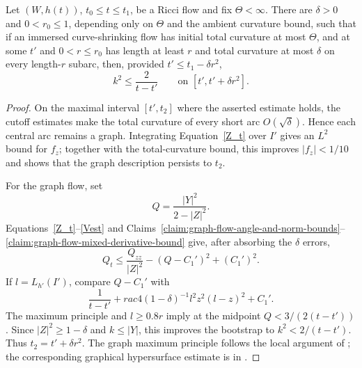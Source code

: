 \begin{lemma}
\label{lem:curve-shrinking-shi-estimate-first-inequality}
\label{csshi1}
Let $(W,h(t))$, $t_0\le t\le t_1$, be a Ricci flow and fix
$\Theta<\infty$. There are $\delta>0$ and $0<r_0\le1$, depending only on
$\Theta$ and the ambient curvature bound, such that if an immersed
curve-shrinking flow has initial total curvature at most $\Theta$, and at some
$t'$ and $0<r\le r_0$ has length at least $r$ and total curvature at most
$\delta$ on every length-$r$ subarc, then, provided
$t'\le t_1-\delta r^2$,
\[
k^2\le\frac2{t-t'}
\qquad\text{on }[t',t'+\delta r^2].
\]
\end{lemma}
\begin{proof}
\sketch On the maximal interval $[t',t_2]$ where the asserted estimate holds,
the cutoff estimates make the total curvature of every short arc
$O(\sqrt\delta)$. Hence each central arc remains a graph. Integrating
Equation~\eqref{Z_t} over $I'$ gives an $L^2$ bound for $f_z$; together with
the total-curvature bound, this improves $|f_z|<1/10$ and shows that the graph
description persists to $t_2$.

For the graph flow, set
\[
Q=\frac{|Y|^2}{2-|Z|^2}.
\]
Equations~\eqref{Z_t}--\eqref{Vest} and
Claims~\ref{claim:graph-flow-angle-and-norm-bounds}--\ref{claim:graph-flow-mixed-derivative-bound}
give, after absorbing the $\delta$ errors,
\[
Q_t\le\frac{Q_{zz}}{|Z|^2}-(Q-C_1')^2+(C_1')^2.
\]
If $l=L_{h'}(I')$, compare $Q-C_1'$ with
\[
\frac1{t-t'}+rac{4(1-\delta)^{-1}l^2}{z^2(l-z)^2}+C_1'.
\]
The maximum principle and $l\ge0.8r$ imply at the midpoint
$Q<3/(2(t-t'))$. Since $|Z|^2\ge1-\delta$ and $k\le|Y|$, this improves the
bootstrap to $k^2<2/(t-t')$. Thus $t_2=t'+\delta r^2$. The graph maximum
principle follows the local argument of \cite{AG}; the corresponding graphical
hypersurface estimate is in \cite{EckerHuisken}.
\end{proof}
